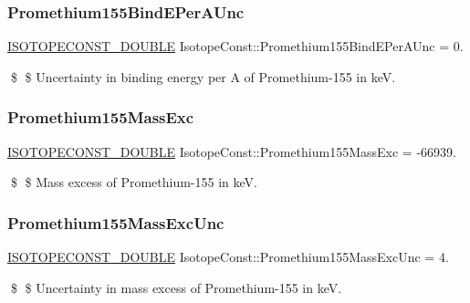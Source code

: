 \subsubsection{\texorpdfstring{Promethium155\+Bind\+E\+Per\+A\+Unc}{Promethium155BindEPerAUnc}}
{\footnotesize\ttfamily \mbox{\hyperlink{group___isotope_const-_macros_ga8f45a7272ce02c0b4c65c44636ed719a}{I\+S\+O\+T\+O\+P\+E\+C\+O\+N\+S\+T\+\_\+\+D\+O\+U\+B\+LE}} Isotope\+Const\+::\+Promethium155\+Bind\+E\+Per\+A\+Unc = 0.}

\$ \$ Uncertainty in binding energy per A of Promethium-\/155 in keV. \mbox{\label{group___isotope_const-_promethium-_pm155_ga0c1a214833b3f430b8cf740907eb4eae}} 
\subsubsection{\texorpdfstring{Promethium155\+Mass\+Exc}{Promethium155MassExc}}
{\footnotesize\ttfamily \mbox{\hyperlink{group___isotope_const-_macros_ga8f45a7272ce02c0b4c65c44636ed719a}{I\+S\+O\+T\+O\+P\+E\+C\+O\+N\+S\+T\+\_\+\+D\+O\+U\+B\+LE}} Isotope\+Const\+::\+Promethium155\+Mass\+Exc = -\/66939.}

\$ \$ Mass excess of Promethium-\/155 in keV. \mbox{\label{group___isotope_const-_promethium-_pm155_ga2c8ec4b6781c7313bedbd82e29f7c6e3}} 
\subsubsection{\texorpdfstring{Promethium155\+Mass\+Exc\+Unc}{Promethium155MassExcUnc}}
{\footnotesize\ttfamily \mbox{\hyperlink{group___isotope_const-_macros_ga8f45a7272ce02c0b4c65c44636ed719a}{I\+S\+O\+T\+O\+P\+E\+C\+O\+N\+S\+T\+\_\+\+D\+O\+U\+B\+LE}} Isotope\+Const\+::\+Promethium155\+Mass\+Exc\+Unc = 4.}

\$ \$ Uncertainty in mass excess of Promethium-\/155 in keV. \mbox{\label{group___isotope_const-_promethium-_pm155_ga1b808cb52ec4c88371c93604744b48da}} 

